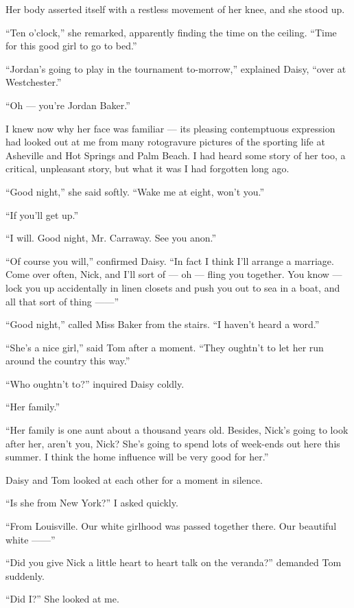 \documentclass{znotebook}
\begin{document}
Her body asserted itself with a restless movement of her knee, and she stood up.

``Ten o'clock,'' she remarked, apparently finding the time on the ceiling. ``Time for this good girl to go to bed.''

``Jordan's going to play in the tournament to-morrow,'' explained Daisy, ``over at Westchester.''

``Oh — you're Jordan Baker.''

I knew now why her face was familiar — its pleasing contemptuous expression had looked out at me from many rotogravure pictures of the sporting life at Asheville and Hot Springs and Palm Beach. I had heard some story of her too, a critical, unpleasant story, but what it was I had forgotten long ago.

``Good night,'' she said softly. ``Wake me at eight, won't you.''

``If you'll get up.''

``I will. Good night, Mr. Carraway. See you anon.''

``Of course you will,'' confirmed Daisy. ``In fact I think I'll arrange a marriage. Come over often, Nick, and I'll sort of — oh — fling you together. You know — lock you up accidentally in linen closets and push you out to sea in a boat, and all that sort of thing ——''

``Good night,'' called Miss Baker from the stairs. ``I haven't heard a word.''

``She's a nice girl,'' said Tom after a moment. ``They oughtn't to let her run around the country this way.''

``Who oughtn't to?'' inquired Daisy coldly.

``Her family.''

``Her family is one aunt about a thousand years old. Besides, Nick's going to look after her, aren't you, Nick? She's going to spend lots of week-ends out here this summer. I think the home influence will be very good for her.''

Daisy and Tom looked at each other for a moment in silence.

``Is she from New York?'' I asked quickly.

``From Louisville. Our white girlhood was passed together there. Our beautiful white ——''

``Did you give Nick a little heart to heart talk on the veranda?'' demanded Tom suddenly.

``Did I?'' She looked at me.
\end{document}
